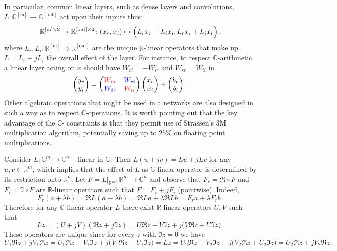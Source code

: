 \documentclass[a4paper,10pt]{article}
\newcommand{\real}{\mathbb{R}}
\newcommand{\cplx}{\mathbb{C}}
\begin{document}
In particular, common linear layers, such as dense layers and convolutions,
$
  L \colon \cplx^{\mathrm{[in]}}
    \to \cplx^{\mathrm{[out]}}
$ act upon their inputs thus:
$$
\real^{\mathrm{[in]} \times 2}
  \to \real^{\mathrm{[out]} \times 2}
  \colon (x_r, x_i)
    \mapsto \Bigl(
      L_r x_r - L_i x_i,
      L_r x_i + L_i x_r
    \Bigr)
  \,, $$
where $
  L_r, L_i
    \colon \real^{\mathrm{[in]}}
      \to \real^{\mathrm{[out]}}
$ are the unique $\real$-linear operators that make up $L = L_r + j L_i$ the overall
effect of the layer. For instance, to respect $\cplx$-arithmetic a linear layer acting
on $x$ should have $W_{ri} = - W_{ir}$ and $W_{rr} = W_{ii}$ in
$$
  \begin{pmatrix}
    y_r \\ y_i
  \end{pmatrix}
    = \begin{pmatrix}
      {\color{red} W_{rr}} & {\color{blue} W_{ri}} \\ 
      {\color{blue} W_{ir}} & {\color{red} W_{ii}}
    \end{pmatrix}
    \begin{pmatrix}
      x_r \\ x_i
    \end{pmatrix}
    + \begin{pmatrix}
      b_r \\ b_i
    \end{pmatrix}
  \,. $$
Other algebraic operations that might be used in a networks are also designed in such a way as
to respect $\cplx$-operations. It is worth pointing out that the key advantage of the $\cplx$-%
constraints is that they permit use of Strassen's $3$M multiplication algorithm, potentially
saving up to $25\%$ on floating point multiplications.

Consider $L\colon \cplx^m \to \cplx^n$ -- linear in $\cplx$. Then $
  L(u + jv) = L u + j L v
$ for any $u, v \in \real^m$, which implies that the effect of $L$ as $\cplx$-linear
operator is determined by its restriction onto $\real^n$. Let $
  F = L\vert_{\real^m}
  \colon \real^m \to \cplx^n
$ and observe that $F_r = \Re \circ F$ and $F_i = \Im \circ F$ are $\real$-linear operators
such that $F = F_r + j F_i$ (pointwise). Indeed,
$$
  F_r(a + \lambda b)
  = \Re L(a + \lambda b)
  = \Re L a + \lambda \Re L b
  = F_r a + \lambda F_r b
  \,. $$
Therefore for any $\cplx$-linear operator $L$ there exist $\real$-linear operators $U, V$
such that
$$
L z 
  = (U + j V) (\Re z + j \Im z)
  = U \Re z - V \Im z + j \bigl( V \Re z + U \Im z \bigr)
  \,. $$
These operators are unique since for every $z$ with $\Im z = 0$ we have
$$
U_1 \Re z + j V_1 \Re z
  = U_1 \Re z - V_1 \Im z + j \bigl( V_1 \Re z + U_1 \Im z \bigr)
  = L z
  = U_2 \Re z - V_2 \Im z + j \bigl( V_2 \Re z + U_2 \Im z \bigr)
  = U_2 \Re z + j V_2 \Re z
  \,. $$
\end{document}
